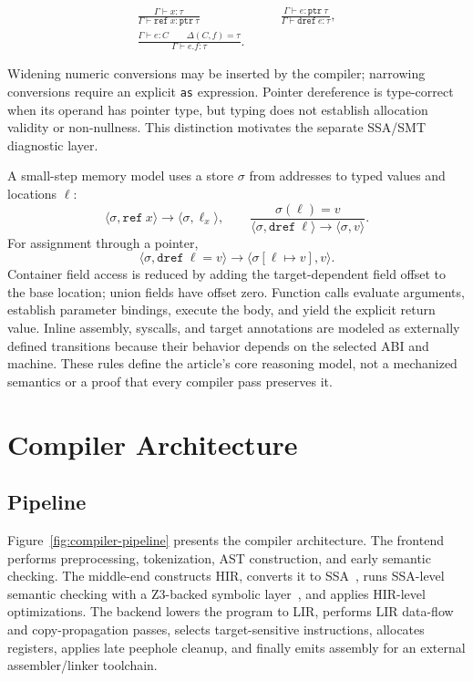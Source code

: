 \documentclass[10pt,twocolumn]{article}
\begin{document}
\begin{align*}
\frac{\Gamma \vdash x : \tau}
     {\Gamma \vdash \texttt{ref}\ x : \texttt{ptr}\ \tau}
&\qquad
\frac{\Gamma \vdash e : \texttt{ptr}\ \tau}
     {\Gamma \vdash \texttt{dref}\ e : \tau},
\\[0.5em]
\frac{\Gamma \vdash e : C \qquad \Delta(C,f)=\tau}
     {\Gamma \vdash e.f : \tau}.&
\end{align*}

\par Widening numeric conversions may be inserted by the compiler; narrowing conversions require an explicit \texttt{as} expression. Pointer dereference is type-correct when its operand has pointer type, but typing does not establish allocation validity or non-nullness. This distinction motivates the separate SSA/SMT diagnostic layer.

\par A small-step memory model uses a store \(\sigma\) from addresses to typed values and locations \(\ell\):
\[
\langle \sigma,\texttt{ref}\ x\rangle \rightarrow
\langle \sigma,\ell_x\rangle,
\qquad
\frac{\sigma(\ell)=v}
     {\langle \sigma,\texttt{dref}\ \ell\rangle \rightarrow
      \langle \sigma,v\rangle}.
\]
For assignment through a pointer,
\[
\langle \sigma,\texttt{dref}\ \ell = v\rangle \rightarrow
\langle \sigma[\ell \mapsto v],v\rangle.
\]
Container field access is reduced by adding the target-dependent field offset to the base location; union fields have offset zero. Function calls evaluate arguments, establish parameter bindings, execute the body, and yield the explicit return value. Inline assembly, syscalls, and target annotations are modeled as externally defined transitions because their behavior depends on the selected ABI and machine. These rules define the article's core reasoning model, not a mechanized semantics or a proof that every compiler pass preserves it.

\section{Compiler Architecture}

\subsection{Pipeline}

\par Figure~\ref{fig:compiler-pipeline} presents the compiler architecture. The frontend performs preprocessing, tokenization, AST construction, and early semantic checking. The middle-end constructs HIR, converts it to SSA~\cite{cytron1991ssa}, runs SSA-level semantic checking with a Z3-backed symbolic layer~\cite{deMoura2008z3}, and applies HIR-level optimizations. The backend lowers the program to LIR, performs LIR data-flow and copy-propagation passes, selects target-sensitive instructions, allocates registers, applies late peephole cleanup, and finally emits assembly for an external assembler/linker toolchain.
\end{document}
